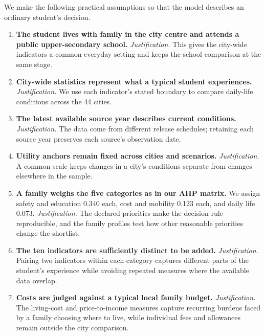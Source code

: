 \documentclass{mcmthesis}
\makeatletter
\newcommand\secstyle[1]{\vbox{\sffamily\Large\bfseries\color{Navy}#1\nointerlineskip\vskip.45ex{\color{Line}\hrule height .7pt}}}
\renewcommand\section{\@startsection{section}{1}{\z@}{-2.6ex \@plus -1ex \@minus -.2ex}{1.2ex \@plus .2ex}{\secstyle}}
\makeatother
\begin{document}
\section{Assumptions and their role}
We make the following practical assumptions so that the model describes an
ordinary student's decision.
\begin{enumerate}
\item \textbf{The student lives with family in the city centre and attends a public upper-secondary school.} \emph{Justification.} This gives the city-wide indicators a common everyday setting and keeps the school comparison at the same stage.
\item \textbf{City-wide statistics represent what a typical student experiences.} \emph{Justification.} We use each indicator's stated boundary to compare daily-life conditions across the 44 cities.
\item \textbf{The latest available source year describes current conditions.} \emph{Justification.} The data come from different release schedules; retaining each source year preserves each source's observation date.
\item \textbf{Utility anchors remain fixed across cities and scenarios.} \emph{Justification.} A common scale keeps changes in a city's conditions separate from changes elsewhere in the sample.
\item \textbf{A family weighs the five categories as in our AHP matrix.} We assign safety and education 0.340 each, cost and mobility 0.123 each, and daily life 0.073. \emph{Justification.} The declared priorities make the decision rule reproducible, and the family profiles test how other reasonable priorities change the shortlist.
\item \textbf{The ten indicators are sufficiently distinct to be added.} \emph{Justification.} Pairing two indicators within each category captures different parts of the student's experience while avoiding repeated measures where the available data overlap.
\item \textbf{Costs are judged against a typical local family budget.} \emph{Justification.} The living-cost and price-to-income measures capture recurring burdens faced by a family choosing where to live, while individual fees and allowances remain outside the city comparison.
\end{enumerate}
\end{document}
